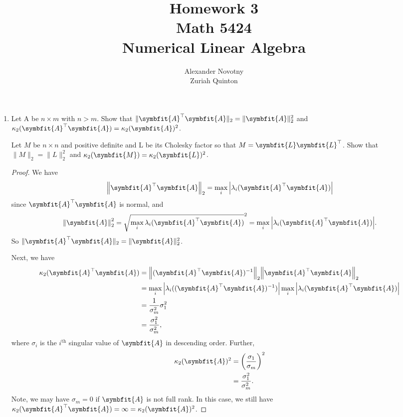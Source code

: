 \documentclass{article}
\title{Homework 3\\{\large Math 5424}\\{\large Numerical Linear Algebra}}
\author{Alexander Novotny\\Zuriah Quinton}
\theoremstyle{definition}
\newcommand{\mat}[1]{\symbfit{#1}}
\begin{document}
\maketitle

\begin{enumerate}[leftmargin=\labelsep]
	\item Let A be \(n \times m\) with \(n > m\). Show that \(\|\mat{A}^\top\mat{A}\|_2 = \|\mat{A}\|_2^2\) and \(\kappa_2 (\mat{A}^\top\mat{A}) = \kappa_2 (\mat{A})^2\).

	      Let \(M\) be \(n \times n\) and positive definite and L be its Cholesky factor so that \(M = \mat{L}\mat{L}^\top\). Show that \(\|M\|_2 = \|L\|_2^2\) and \(\kappa_2(\mat{M}) = \kappa_2(\mat{L})^2\).
	      \begin{proof}
		      We have
		      \begin{equation*}
			      \norm{\mat{A}^\top \mat{A}}_2 = \max_i \abs{ \lambda_i(\mat{A}^\top \mat{A}) } %
		      \end{equation*}
		      since \(\mat{A}^\top \mat{A}\) is normal, and
		      \begin{equation*}
			      \norm{\mat{A}}^2_2 = \sqrt{ \max_i \lambda_i(\mat{A}^\top \mat{A}) } ^2= \max_i \abs{ \lambda_i(\mat{A}^\top \mat{A}) }.
		      \end{equation*}
		      So \(\|\mat{A}^\top\mat{A}\|_2 = \|\mat{A}\|_2^2\).

		      Next, we have
		      \begin{align*}
			      \kappa_2(\mat{A}^\top \mat{A}) & = \norm{(\mat{A}^\top \mat{A})^{-1}}_2 \norm{\mat{A}^\top \mat{A}}_2                                   \\
			                                     & = \max_i \abs{ \lambda_i((\mat{A}^\top \mat{A})^{-1} )} \max_i \abs{ \lambda_i(\mat{A}^\top \mat{A}) } \\
			                                     & = \frac{1}{\sigma_m^2} \sigma_1^2                                                                      \\
			                                     & = \frac{\sigma_1^2}{\sigma_m^2},
		      \end{align*}
		      where \(\sigma_i\) is the \(i^{\text{th}}\) singular value of \(\mat{A}\) in descending order. Further,
		      \begin{align*}
			      \kappa_2(\mat{A})^2 & = \qty(\frac{\sigma_1}{\sigma_m})^2 \\
			                          & = \frac{\sigma_1^2}{\sigma_m^2}.
		      \end{align*}
		      Note, we may have \(\sigma_m=0\) if \(\mat{A}\) is not full rank. In this case, we still have \(\kappa_2(\mat{A}^\top \mat{A})=\infty=\kappa_2(\mat{A})^2\).


\end{proof}
\end{enumerate}
\end{document}
